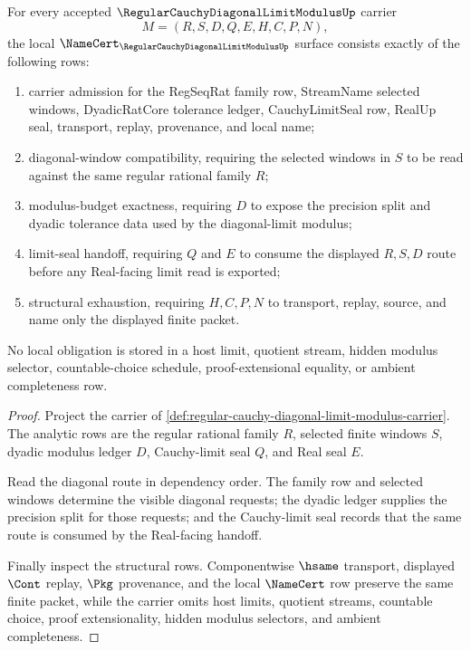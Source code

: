 \begin{theorem}
\label{thm:regular-cauchy-diagonal-limit-modulus-namecert-obligations}
For every accepted $\RegularCauchyDiagonalLimitModulusUp$ carrier
$$
M=(R,S,D,Q,E,H,C,P,N),
$$
the local $\NameCert_{\RegularCauchyDiagonalLimitModulusUp}$ surface consists exactly of the following rows:
\begin{enumerate}
\item carrier admission for the RegSeqRat family row, StreamName selected windows, DyadicRatCore tolerance ledger, CauchyLimitSeal row, RealUp seal, transport, replay, provenance, and local name;
\item diagonal-window compatibility, requiring the selected windows in $S$ to be read against the same regular rational family $R$;
\item modulus-budget exactness, requiring $D$ to expose the precision split and dyadic tolerance data used by the diagonal-limit modulus;
\item limit-seal handoff, requiring $Q$ and $E$ to consume the displayed $R,S,D$ route before any Real-facing limit read is exported;
\item structural exhaustion, requiring $H,C,P,N$ to transport, replay, source, and name only the displayed finite packet.
\end{enumerate}
No local obligation is stored in a host limit, quotient stream, hidden modulus selector, countable-choice schedule, proof-extensional equality, or ambient completeness row.
\end{theorem}
\begin{proof}
Project the carrier of \autoref{def:regular-cauchy-diagonal-limit-modulus-carrier}. The analytic rows are the regular rational family $R$, selected finite windows $S$, dyadic modulus ledger $D$, Cauchy-limit seal $Q$, and Real seal $E$.

Read the diagonal route in dependency order. The family row and selected windows determine the visible diagonal requests; the dyadic ledger supplies the precision split for those requests; and the Cauchy-limit seal records that the same route is consumed by the Real-facing handoff.

Finally inspect the structural rows. Componentwise $\hsame$ transport, displayed $\Cont$ replay, $\Pkg$ provenance, and the local $\NameCert$ row preserve the same finite packet, while the carrier omits host limits, quotient streams, countable choice, proof extensionality, hidden modulus selectors, and ambient completeness.
\end{proof}

